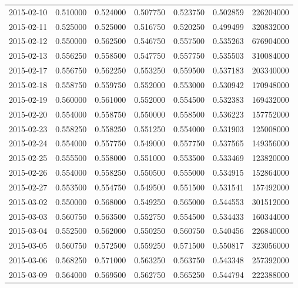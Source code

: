 \begin{tabular}{lrrrrrr}
2015-02-10 &    0.510000 &    0.524000 &    0.507750 &    0.523750 &    0.502859 &   226204000 \\
2015-02-11 &    0.525000 &    0.525000 &    0.516750 &    0.520250 &    0.499499 &   320832000 \\
2015-02-12 &    0.550000 &    0.562500 &    0.546750 &    0.557500 &    0.535263 &   676904000 \\
2015-02-13 &    0.556250 &    0.558500 &    0.547750 &    0.557750 &    0.535503 &   310084000 \\
2015-02-17 &    0.556750 &    0.562250 &    0.553250 &    0.559500 &    0.537183 &   203340000 \\
2015-02-18 &    0.558750 &    0.559750 &    0.552000 &    0.553000 &    0.530942 &   170948000 \\
2015-02-19 &    0.560000 &    0.561000 &    0.552000 &    0.554500 &    0.532383 &   169432000 \\
2015-02-20 &    0.554000 &    0.558750 &    0.550000 &    0.558500 &    0.536223 &   157752000 \\
2015-02-23 &    0.558250 &    0.558250 &    0.551250 &    0.554000 &    0.531903 &   125008000 \\
2015-02-24 &    0.554000 &    0.557750 &    0.549000 &    0.557750 &    0.537565 &   149356000 \\
2015-02-25 &    0.555500 &    0.558000 &    0.551000 &    0.553500 &    0.533469 &   123820000 \\
2015-02-26 &    0.554000 &    0.558250 &    0.550500 &    0.555000 &    0.534915 &   152864000 \\
2015-02-27 &    0.553500 &    0.554750 &    0.549500 &    0.551500 &    0.531541 &   157492000 \\
2015-03-02 &    0.550000 &    0.568000 &    0.549250 &    0.565000 &    0.544553 &   301512000 \\
2015-03-03 &    0.560750 &    0.563500 &    0.552750 &    0.554500 &    0.534433 &   160344000 \\
2015-03-04 &    0.552500 &    0.562000 &    0.550250 &    0.560750 &    0.540456 &   226840000 \\
2015-03-05 &    0.560750 &    0.572500 &    0.559250 &    0.571500 &    0.550817 &   323056000 \\
2015-03-06 &    0.568250 &    0.571000 &    0.563250 &    0.563750 &    0.543348 &   257392000 \\
2015-03-09 &    0.564000 &    0.569500 &    0.562750 &    0.565250 &    0.544794 &   222388000 \\

\end{tabular}
